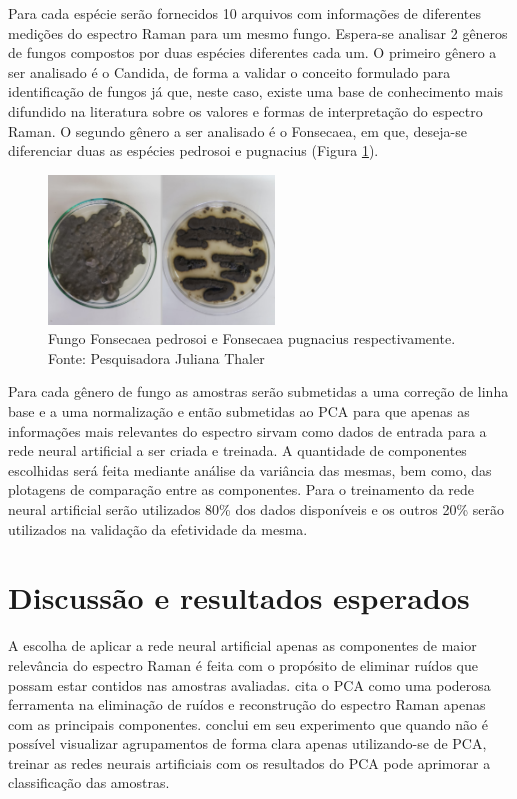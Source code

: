 \documentclass[conference,peerreview]{IEEEtran}
\begin{document}
Para cada espécie serão fornecidos 10 arquivos com informações de diferentes medições do espectro Raman para um mesmo fungo. Espera-se analisar 2 gêneros de fungos compostos por duas espécies diferentes cada um. O primeiro gênero a ser analisado é o Candida, de forma a validar o conceito formulado para identificação de fungos já que, neste caso, existe uma base de conhecimento mais difundido na literatura sobre os valores e formas de interpretação do espectro Raman. O segundo gênero a ser analisado é o Fonsecaea, em que, deseja-se diferenciar duas as espécies pedrosoi e pugnacius (Figura \ref{pedrosoi_pugnacius}).

\begin{figure}[ht]
\centering
\includegraphics[width=6cm]{pedrosoi_pugnacius}
\caption{Fungo Fonsecaea pedrosoi e Fonsecaea pugnacius respectivamente. Fonte: Pesquisadora Juliana Thaler}
\label{pedrosoi_pugnacius}
\end{figure}

Para cada gênero de fungo as amostras serão submetidas a uma correção de linha base e a uma normalização e então submetidas ao PCA para que apenas as informações mais relevantes do espectro sirvam como dados de entrada para a rede neural artificial a ser criada e treinada. A quantidade de componentes escolhidas será feita mediante análise da variância das mesmas, bem como, das plotagens de comparação entre as componentes. Para o treinamento da rede neural artificial serão utilizados 80\% dos dados disponíveis e os outros 20\% serão utilizados na validação da efetividade da mesma.

\section{Discussão e resultados esperados}

A escolha de aplicar a rede neural artificial apenas as componentes de maior relevância do espectro Raman é feita com o propósito de eliminar ruídos que possam estar contidos nas amostras avaliadas. \cite{Butler2016} cita o PCA como uma poderosa ferramenta na eliminação de ruídos e reconstrução do espectro Raman apenas com as principais componentes. \cite{DeGoes2016} conclui em seu experimento que quando não é possível visualizar agrupamentos de forma clara apenas utilizando-se de PCA, treinar as redes neurais artificiais com os resultados do PCA pode aprimorar a classificação das amostras.
\end{document}

